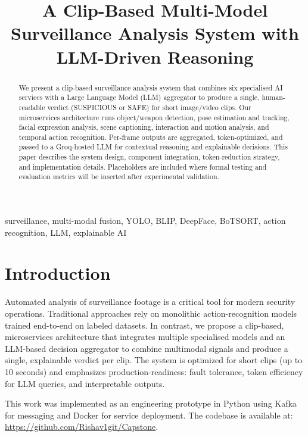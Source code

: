 \documentclass[conference]{IEEEtran}
\title{A Clip-Based Multi-Model Surveillance Analysis System with LLM-Driven Reasoning}
\author{\IEEEauthorblockN{Rishav Kumar Agrawal, Maharishi Bhowmick, Sachin Koli, Mir Abbas Hussain, Dr. Vaishali Sindhe}
\IEEEauthorblockA{PES University, India \\
\{rishav, maharishi, sachin, mirabbas, vaishali\}@pes.edu (placeholder)}
}
\begin{document}
\maketitle

\begin{abstract}
We present a clip-based surveillance analysis system that combines six specialised AI services with a Large Language Model (LLM) aggregator to produce a single, human-readable verdict (SUSPICIOUS or SAFE) for short image/video clips. Our microservices architecture runs object/weapon detection, pose estimation and tracking, facial expression analysis, scene captioning, interaction and motion analysis, and temporal action recognition. Per-frame outputs are aggregated, token-optimized, and passed to a Groq-hosted LLM for contextual reasoning and explainable decisions. This paper describes the system design, component integration, token-reduction strategy, and implementation details. Placeholders are included where formal testing and evaluation metrics will be inserted after experimental validation.
\end{abstract}

\begin{IEEEkeywords}
surveillance, multi-modal fusion, YOLO, BLIP, DeepFace, BoTSORT, action recognition, LLM, explainable AI
\end{IEEEkeywords}

\section{Introduction}
Automated analysis of surveillance footage is a critical tool for modern security operations. Traditional approaches rely on monolithic action-recognition models trained end-to-end on labeled datasets. In contrast, we propose a clip-based, microservices architecture that integrates multiple specialised models and an LLM-based decision aggregator to combine multimodal signals and produce a single, explainable verdict per clip. The system is optimized for short clips (up to 10 seconds) and emphasizes production-readiness: fault tolerance, token efficiency for LLM queries, and interpretable outputs.

This work was implemented as an engineering prototype in Python using Kafka for messaging and Docker for service deployment. The codebase is available at: \url{https://github.com/Rishav1git/Capstone}.
\end{document}
